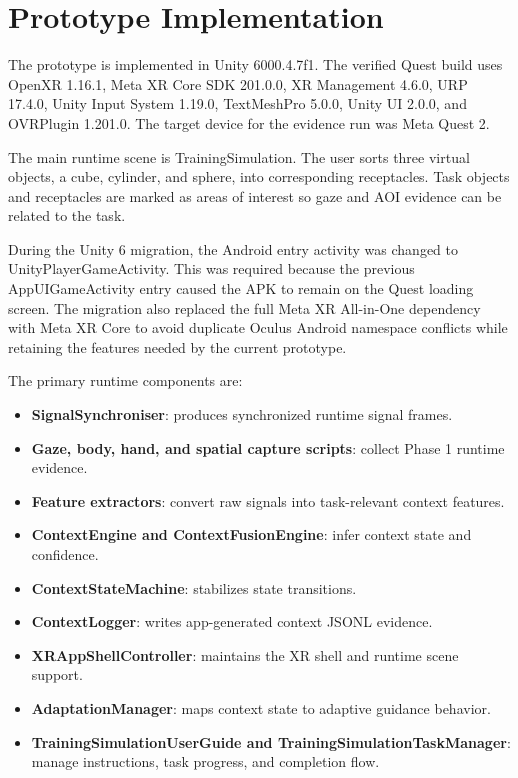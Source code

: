 \documentclass[conference]{IEEEtran}
\begin{document}
\section{Prototype Implementation}
The prototype is implemented in Unity 6000.4.7f1. The verified Quest build uses OpenXR 1.16.1, Meta XR Core SDK 201.0.0, XR Management 4.6.0, URP 17.4.0, Unity Input System 1.19.0, TextMeshPro 5.0.0, Unity UI 2.0.0, and OVRPlugin 1.201.0. The target device for the evidence run was Meta Quest 2.

The main runtime scene is TrainingSimulation. The user sorts three virtual objects, a cube, cylinder, and sphere, into corresponding receptacles. Task objects and receptacles are marked as areas of interest so gaze and AOI evidence can be related to the task.

During the Unity 6 migration, the Android entry activity was changed to UnityPlayerGameActivity. This was required because the previous AppUIGameActivity entry caused the APK to remain on the Quest loading screen. The migration also replaced the full Meta XR All-in-One dependency with Meta XR Core to avoid duplicate Oculus Android namespace conflicts while retaining the features needed by the current prototype.

The primary runtime components are:
\begin{itemize}
\item \textbf{SignalSynchroniser}: produces synchronized runtime signal frames.
\item \textbf{Gaze, body, hand, and spatial capture scripts}: collect Phase 1 runtime evidence.
\item \textbf{Feature extractors}: convert raw signals into task-relevant context features.
\item \textbf{ContextEngine and ContextFusionEngine}: infer context state and confidence.
\item \textbf{ContextStateMachine}: stabilizes state transitions.
\item \textbf{ContextLogger}: writes app-generated context JSONL evidence.
\item \textbf{XRAppShellController}: maintains the XR shell and runtime scene support.
\item \textbf{AdaptationManager}: maps context state to adaptive guidance behavior.
\item \textbf{TrainingSimulationUserGuide and TrainingSimulationTaskManager}: manage instructions, task progress, and completion flow.
\end{itemize}
\end{document}

